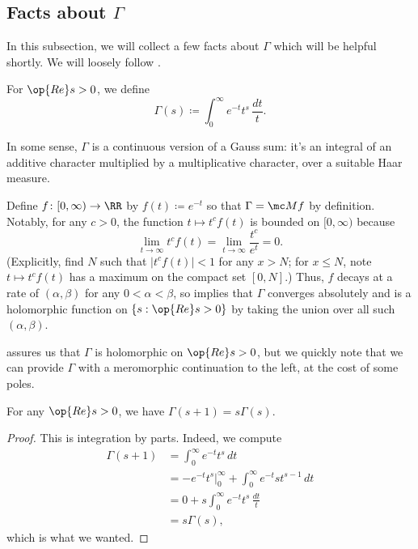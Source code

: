 \documentclass[../notes.tex]{subfiles}
\begin{document}
\subsection{Facts about \texorpdfstring{$\Gamma$}{ Gamma}}
In this subsection, we will collect a few facts about $\Gamma$ which will be helpful shortly. We will loosely follow \cite[Section 1]{tao-gamma-function}.
\begin{definition}
	For $\op{Re}s>0$, we define
	\[\Gamma(s)\coloneqq\int_0^\infty e^{-t}t^s\,\frac{dt}t.\]
\end{definition}
\begin{remark}
	In some sense, $\Gamma$ is a continuous version of a Gauss sum: it's an integral of an additive character multiplied by a multiplicative character, over a suitable Haar measure.
\end{remark}
\begin{remark} \label{rem:gamma-is-holo}
	Define $f\colon[0,\infty)\to\RR$ by $f(t)\coloneqq e^{-t}$ so that $\Gamma=\mc Mf$ by definition. Notably, for any $c>0$, the function $t\mapsto t^cf(t)$ is bounded on $[0,\infty)$ because
	\[\lim_{t\to\infty}t^cf(t)=\lim_{t\to\infty}\frac{t^c}{e^t}=0.\]
	(Explicitly, find $N$ such that $\left|t^cf(t)\right|<1$ for any $x>N$; for $x\le N$, note $t\mapsto t^cf(t)$ has a maximum on the compact set $[0,N]$.) Thus, $f$ decays at a rate of $(\alpha,\beta)$ for any $0<\alpha<\beta$, so  implies that $\Gamma$ converges absolutely and is a holomorphic function on $\{s:\op{Re}s>0\}$ by taking the union over all such $(\alpha,\beta)$.
\end{remark}
 assures us that $\Gamma$ is holomorphic on $\op{Re}s>0$, but we quickly note that we can provide $\Gamma$ with a meromorphic continuation to the left, at the cost of some poles.
\begin{lemma} \label{lem:ind-continue-gamma}
	For any $\op{Re}s>0$, we have $\Gamma(s+1)=s\Gamma(s)$.
\end{lemma}
\begin{proof}
	This is integration by parts. Indeed, we compute
	\begin{align*}
		\Gamma(s+1) &= \int_0^\infty e^{-t}t^{s}\,dt \\
		&= -e^{-t}t^s\bigg|_0^\infty+\int_0^\infty e^{-t}st^{s-1}\,dt \\
		&= 0+s\int_0^\infty e^{-t}t^s\,\frac{dt}t \\
		&= s\Gamma(s),
	\end{align*}
	which is what we wanted.
\end{proof}
\end{document}
